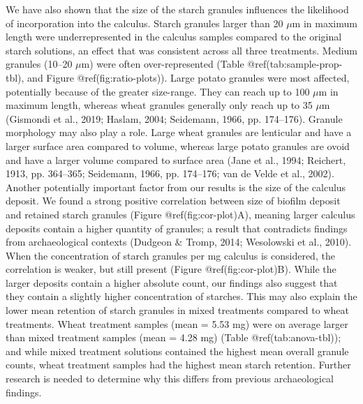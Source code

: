 \documentclass[
  letterpaper,
]{book}
\begin{document}
We have also shown that the size of the starch granules influences the
likelihood of incorporation into the calculus. Starch granules larger
than 20 \(\mu\)m in maximum length were underrepresented in the calculus
samples compared to the original starch solutions, an effect that was
consistent across all three treatments. Medium granules (10--20
\(\mu\)m) were often over-represented (Table @ref(tab:sample-prop-tbl),
and Figure @ref(fig:ratio-plots)). Large potato granules were most
affected, potentially because of the greater size-range. They can reach
up to 100 \(\mu\)m in maximum length, whereas wheat granules generally
only reach up to 35 \(\mu\)m (Gismondi et al., 2019; Haslam, 2004;
Seidemann, 1966, pp. 174--176). Granule morphology may also play a role.
Large wheat granules are lenticular and have a larger surface area
compared to volume, whereas large potato granules are ovoid and have a
larger volume compared to surface area (Jane et al., 1994; Reichert,
1913, pp. 364--365; Seidemann, 1966, pp. 174--176; van de Velde et al.,
2002). Another potentially important factor from our results is the size
of the calculus deposit. We found a strong positive correlation between
size of biofilm deposit and retained starch granules (Figure
@ref(fig:cor-plot)A), meaning larger calculus deposits contain a higher
quantity of granules; a result that contradicts findings from
archaeological contexts (Dudgeon \& Tromp, 2014; Wesolowski et al.,
2010). When the concentration of starch granules per mg calculus is
considered, the correlation is weaker, but still present (Figure
@ref(fig:cor-plot)B). While the larger deposits contain a higher
absolute count, our findings also suggest that they contain a slightly
higher concentration of starches. This may also explain the lower mean
retention of starch granules in mixed treatments compared to wheat
treatments. Wheat treatment samples (mean = 5.53 mg) were on average
larger than mixed treatment samples (mean = 4.28 mg) (Table
@ref(tab:anova-tbl)); and while mixed treatment solutions contained the
highest mean overall granule counts, wheat treatment samples had the
highest mean starch retention. Further research is needed to determine
why this differs from previous archaeological findings.
\end{document}
